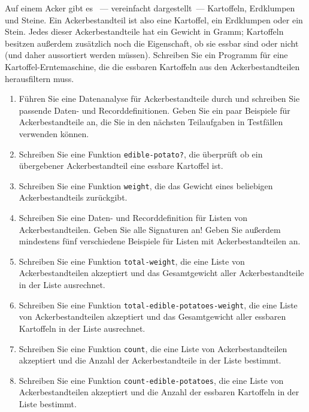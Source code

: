 \begin{aufgabe}
   Auf einem Acker gibt es ~--- vereinfacht
  dargestellt~--- Kartoffeln, Erdklumpen und Steine.  Ein
  Ackerbestandteil ist also eine Kartoffel, ein Erdklumpen oder ein
  Stein.  Jedes dieser Ackerbestandteile hat ein Gewicht in Gramm;
  Kartoffeln besitzen außerdem zusätzlich noch die Eigenschaft, ob sie
  essbar sind oder nicht (und daher aussortiert werden müssen).
  Schreiben Sie ein Programm für eine Kartoffel-Erntemaschine, die die
  essbaren Kartoffeln aus den Ackerbestandteilen herausfiltern muss.

  \begin{enumerate}
  \item Führen Sie eine Datenanalyse für
    Ackerbestandteile durch und schreiben Sie passende Daten- und
    Recorddefinitionen.  Geben Sie ein paar Beispiele für
    Ackerbestandteile an, die Sie in den nächsten Teilaufgaben in
    Testfällen verwenden können.

  \item Schreiben Sie eine Funktion
    \texttt{edible-potato?}, die überprüft ob ein übergebener
    Ackerbestandteil eine essbare Kartoffel ist.

  \item Schreiben Sie eine Funktion \texttt{weight}, 
    die das Gewicht eines beliebigen Ackerbestandteils zurückgibt.

  \item Schreiben Sie eine Daten- und Recorddefinition
    für Listen von Ackerbestandteilen.  Geben Sie alle Signaturen an!
    Geben Sie außerdem mindestens fünf verschiedene Beispiele für Listen
    mit Ackerbestandteilen an.

  \item Schreiben Sie eine Funktion \texttt{total-weight},
    die eine Liste von Ackerbestandteilen akzeptiert und das Gesamtgewicht
    aller Ackerbestandteile in der Liste ausrechnet.

  \item Schreiben Sie eine Funktion
    \texttt{total-edible-potatoes-weight}, die eine Liste von Ackerbestandteilen
    akzeptiert und das Gesamtgewicht aller essbaren Kartoffeln in der Liste
    ausrechnet.

  \item Schreiben Sie eine Funktion \texttt{count}, die 
    eine Liste von Ackerbestandteilen akzeptiert und die Anzahl der
    Ackerbestandteile in der Liste bestimmt.

  \item Schreiben Sie eine Funktion
    \texttt{count-edible-potatoes}, die eine Liste von
    Ackerbestandteilen akzeptiert und die Anzahl der essbaren
    Kartoffeln in der Liste bestimmt.


\end{enumerate}
\end{aufgabe}
